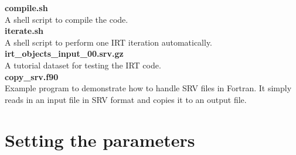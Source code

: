 \documentclass[11pt]{article}
\begin{document}
{\bf compile.sh}\\
A shell script to compile the code. \vspace{0.5cm} \\
{\bf iterate.sh}\\
A shell script to perform one IRT iteration automatically. \vspace{0.5cm} \\
{\bf irt\_objects\_input\_00.srv.gz}\\
A tutorial dataset for testing the IRT code. \vspace{0.5cm} \\
{\bf copy\_srv.f90}\\
Example program to demonstrate how to handle SRV files in Fortran. It simply reads in an input file in SRV format and copies it to an output file.

\section{Setting the parameters}\label{sec_parameters}
\end{document}
